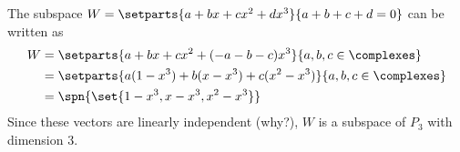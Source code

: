 The subspace $W = \setparts{a + bx + cx^2 + dx^3}{a + b + c + d = 0}$ can be written as 
%
\begin{align*}
W 
&= \setparts{a + bx + cx^2 + (-a -b -c)x^3}{a,b,c\in\complexes}\\
&= \setparts{a(1-x^3) + b(x - x^3) + c(x^2 - x^3)}{a,b,c\in\complexes}\\
&= \spn{\set{1 - x^3, x - x^3, x^2 - x^3}}
\end{align*}
%
Since these vectors are linearly independent (why?), $W$ is a subspace of $P_3$ with dimension 3.  